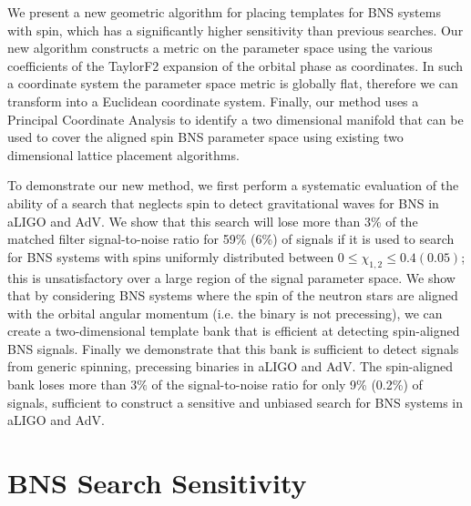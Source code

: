 We present a new geometric algorithm for placing templates for BNS systems
with spin, which has a significantly higher sensitivity than previous
searches.  Our new algorithm constructs a metric on the parameter space using
the various coefficients of the TaylorF2 expansion of the orbital phase as
coordinates. In such a coordinate system the parameter space metric is
globally flat, therefore we can transform into a Euclidean coordinate system.
Finally, our method uses a Principal Coordinate Analysis to identify a two
dimensional manifold that can be used to cover the aligned spin BNS parameter
space using existing two dimensional lattice placement algorithms.

To demonstrate our new method, we first perform a systematic evaluation of the ability
of a search that neglects spin to detect gravitational waves for BNS in aLIGO
and AdV.  We show that this search will lose more than $3\%$ of the
matched filter signal-to-noise ratio for 59\% (6\%) of signals if it is used to search
for BNS systems with spins uniformly distributed between $0 \le \chi_{1,2} \le
0.4 (0.05)$; this is unsatisfactory over a
large region of the signal parameter space. We show that by considering BNS
systems where the spin of the neutron stars are aligned with the orbital
angular momentum (i.e. the binary is not precessing), we can create a
two-dimensional template bank that is efficient at detecting spin-aligned BNS
signals. Finally we demonstrate that this bank is sufficient to detect signals
from generic spinning, precessing binaries in aLIGO and AdV. The spin-aligned
bank loses more than $3\%$ of the signal-to-noise ratio for only 9\% (0.2\%)
of signals, sufficient to construct a sensitive and unbiased search for BNS
systems in aLIGO and AdV.

\section{BNS Search Sensitivity}
\label{ssec:nonspin_performance}
\label{sec:spin_import}

